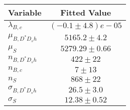 \begin{tabular}[t]{lc}
\hline
Variable &Fitted Value\\
\hline\hline
$\lambda_{B,c}$&$(-0.1\pm4.8)e-05$\\
\hline
$\mu_{B, D^* D_s h}$&$5165.2\pm4.2$\\
\hline
$\mu_S$&$5279.29\pm0.66$\\
\hline
$n_{B, D^* D_s h}$&$422\pm22$\\
\hline
$n_{B,c}$&$7\pm13$\\
\hline
$n_S$&$868\pm22$\\
\hline
$\sigma_{B, D^* D_s h}$&$26.5\pm3.0$\\
\hline
$\sigma_S$&$12.38\pm0.52$\\
\hline
\end{tabular}
